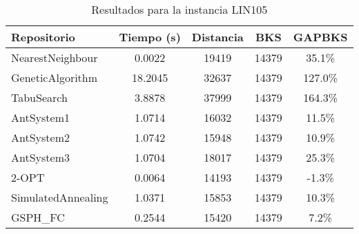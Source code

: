 \begin{table}[H]
\centering
\caption{Resultados para la instancia LIN105}
\begin{tabular}{|l|c|c|c|c|}
\hline
\textbf{Repositorio} & \textbf{Tiempo (s)} & \textbf{Distancia} & \textbf{BKS} & \textbf{GAPBKS} \\ 
\hline
NearestNeighbour & 0.0022 & 19419 & 14379 & 35.1\% \\ 
GeneticAlgorithm & 18.2045 & 32637 & 14379 & 127.0\% \\ 
TabuSearch & 3.8878 & 37999 & 14379 & 164.3\% \\ 
AntSystem1 & 1.0714 & 16032 & 14379 & 11.5\% \\ 
AntSystem2 & 1.0742 & 15948 & 14379 & 10.9\% \\ 
AntSystem3 & 1.0704 & 18017 & 14379 & 25.3\% \\ 
2-OPT & 0.0064 & 14193 & 14379 & -1.3\% \\ 
SimulatedAnnealing & 1.0371 & 15853 & 14379 & 10.3\% \\ 
GSPH_FC & 0.2544 & 15420 & 14379 & 7.2\% \\ 
\hline
\end{tabular}
\end{table}
